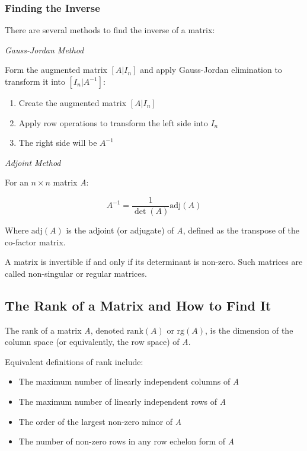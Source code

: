 \subsubsection{Finding the Inverse}
There are several methods to find the inverse of a matrix:

\emph{Gauss-Jordan Method} 

Form the augmented matrix \([A|I_n]\) and apply Gauss-Jordan elimination to transform it into \([I_n|A^{-1}]\):
\begin{enumerate}
    \item Create the augmented matrix \([A|I_n]\)
    \item Apply row operations to transform the left side into \(I_n\)
    \item The right side will be \(A^{-1}\)
\end{enumerate}

\emph{Adjoint Method}

For an \(n \times n\) matrix \emph{A}:

\[
    A^{-1} = \frac{1}{\det(A)} \text{adj}(A)
\]

Where \(\text{adj}(A)\) is the adjoint (or adjugate) of \emph{A}, defined as the transpose of the co-factor matrix.

A matrix is invertible if and only if its determinant is non-zero. Such matrices are called non-singular or regular matrices.

\subsection{The Rank of a Matrix and How to Find It}

The rank of a matrix \emph{A}, denoted \(\text{rank}(A)\) or \(\text{rg}(A)\), is the dimension of the column space (or equivalently, the row space) of \emph{A}.

Equivalent definitions of rank include:

\begin{itemize}
    \item The maximum number of linearly independent columns of \emph{A}
    \item The maximum number of linearly independent rows of \emph{A}
    \item The order of the largest non-zero minor of \emph{A}
    \item The number of non-zero rows in any row echelon form of \emph{A}
\end{itemize}


